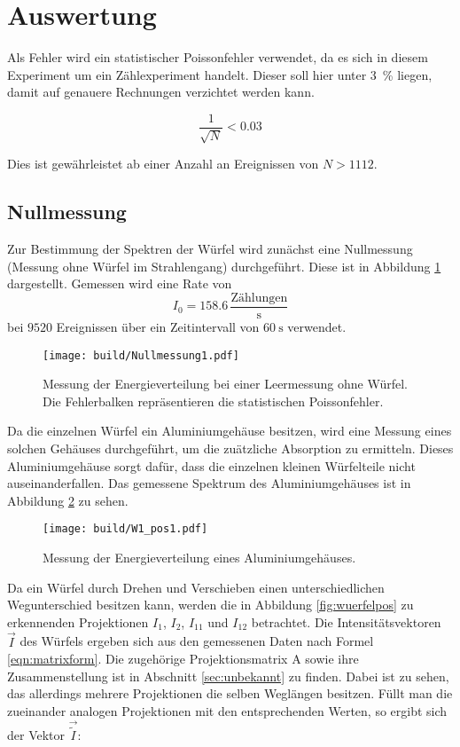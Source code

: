 \newpage
\section{Auswertung}

\label{sec:Auswertung}

Als Fehler wird ein statistischer Poissonfehler verwendet, da es sich in diesem
Experiment um ein Zählexperiment handelt. Dieser soll hier unter \SI{3}{\percent} liegen,
damit auf genauere Rechnungen verzichtet werden kann.

\begin{equation*}
  \frac{1}{\sqrt{N}} < 0.03
\end{equation*}

Dies ist gewährleistet ab einer Anzahl an Ereignissen von $N > \num{1112}$.

\subsection{Nullmessung}
Zur Bestimmung der Spektren der Würfel wird zunächst eine Nullmessung (Messung
ohne Würfel im Strahlengang) durchgeführt. Diese ist in Abbildung \ref{fig:leer}
dargestellt. Gemessen wird eine Rate von
\begin{equation*}
    I_0 = 158.6 \,\frac{\text{Zählungen}}{\text{s}}
\end{equation*}
bei $9520$ Ereignissen über ein Zeitintervall von $\SI{60}{\second}$ verwendet.

\begin{figure}[htb]
  \centering
  \texttt{[image: build/Nullmessung1.pdf]}
  \caption{Messung der Energieverteilung bei einer Leermessung ohne Würfel. Die
  Fehlerbalken repräsentieren die statistischen Poissonfehler.}
  \label{fig:leer}
\end{figure}
\FloatBarrier
Da die einzelnen Würfel ein Aluminiumgehäuse besitzen, wird eine Messung eines solchen
Gehäuses durchgeführt, um die zuätzliche Absorption zu ermitteln. Dieses Aluminiumgehäuse
sorgt dafür, dass die einzelnen kleinen Würfelteile nicht auseinanderfallen. Das
gemessene Spektrum des Aluminiumgehäuses ist in
Abbildung \ref{fig:alu} zu sehen.

\begin{figure}[htb]
  \centering
  \texttt{[image: build/W1\_pos1.pdf]}
  \caption{Messung der Energieverteilung eines Aluminiumgehäuses.}
  \label{fig:alu}
\end{figure}
\FloatBarrier
Da ein Würfel durch Drehen und Verschieben einen unterschiedlichen Wegunterschied
besitzen kann, werden die in Abbildung \ref{fig:wuerfelpos} zu erkennenden Projektionen
$I_1$, $I_2$, $I_{11}$ und $I_{12}$ betrachtet. Die Intensitätsvektoren $\vec{I}$ des Würfels ergeben sich aus
den gemessenen Daten nach Formel \eqref{eqn:matrixform}.
Die zugehörige Projektionsmatrix A sowie ihre Zusammenstellung
ist in Abschnitt \ref{sec:unbekannt} zu finden.
Dabei ist zu sehen, das allerdings mehrere Projektionen die selben Weglängen
besitzen. Füllt man die zueinander analogen Projektionen mit den entsprechenden Werten,
so ergibt sich der Vektor $\vec{\tilde{I}}$:

